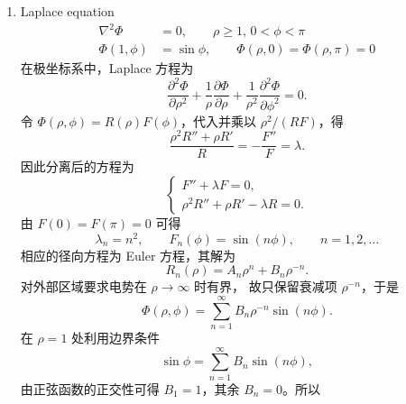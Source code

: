 \documentclass[a4paper]{article}
\begin{document}
    \begin{enumerate}
    \item[(a)] Laplace equation
        \begin{align*}
            \nabla^2 \Phi &= 0, \qquad \rho \geq 1, \, 0 < \phi < \pi \\
            \Phi(1, \phi) &= \sin \phi, \qquad \Phi(\rho, 0) = \Phi(\rho, \pi) = 0
        \end{align*}
        在极坐标系中，Laplace 方程为
        \begin{equation*}
            \frac{\partial^2\Phi}{\partial \rho^2}
            +\frac{1}{\rho}\frac{\partial\Phi}{\partial\rho}
            +\frac{1}{\rho^2}\frac{\partial^2\Phi}{\partial\phi^2}=0.
        \end{equation*}
        令 $\Phi(\rho,\phi)=R(\rho) F(\phi)$，代入并乘以
        $\rho^2/(R F)$，得
        \begin{equation*}
            \frac{\rho^2R''+\rho R'}{R}
            =-\frac{ F''}{ F}=\lambda.
        \end{equation*}
        因此分离后的方程为
        \begin{equation*}
            \begin{cases}
                F''+\lambda F=0,\\
                \rho^2R''+\rho R'-\lambda R=0.
            \end{cases}
        \end{equation*}
        由 $ F(0)= F(\pi)=0$ 可得
        \begin{equation*}
            \lambda_n=n^2,\qquad  F_n(\phi)=\sin(n\phi),\qquad
            n=1,2,\ldots
        \end{equation*}
        相应的径向方程为 Euler 方程，其解为
        \begin{equation*}
            R_n(\rho)=A_n\rho^n+B_n\rho^{-n}.
        \end{equation*}
        对外部区域要求电势在 $\rho\to\infty$ 时有界，
        故只保留衰减项 $\rho^{-n}$，于是
        \begin{equation*}
            \Phi(\rho,\phi)=\sum_{n=1}^{\infty}B_n\rho^{-n}\sin(n\phi).
        \end{equation*}
        在 $\rho=1$ 处利用边界条件
        \begin{equation*}
            \sin\phi=\sum_{n=1}^{\infty}B_n\sin(n\phi),
        \end{equation*}
        由正弦函数的正交性可得 $B_1=1$，其余 $B_n=0$。所以
        \begin{equation*}

\end{equation*}
\end{enumerate}
\end{document}
